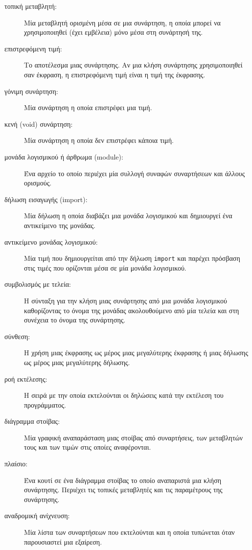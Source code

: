 \documentclass[10pt]{book}
\begin{document}
\begin{description}
\item[τοπική μεταβλητή:] Μία μεταβλητή ορισμένη μέσα σε μια συνάρτηση, η οποία 
μπορεί να χρησιμοποιηθεί (έχει εμβέλεια) μόνο μέσα στη συνάρτησή της.

\item[επιστρεφόμενη τιμή:] Το αποτέλεσμα μιας συνάρτησης. Αν μια κλήση συνάρτησης χρησιμοποιηθεί σαν έκφραση, η επιστρεφόμενη τιμή είναι η τιμή της έκφρασης.

\item[γόνιμη συνάρτηση:] Μία συνάρτηση η οποία επιστρέφει μια τιμή.

\item[κενή  (void)  συνάρτηση:] Μία συνάρτηση η οποία δεν επιστρέφει κάποια τιμή.

\item[μονάδα λογισμικού ή άρθρωμα (module):] Ένα αρχείο το οποίο περιέχει μία συλλογή συναφών συναρτήσεων και άλλους ορισμούς.

\item[δήλωση εισαγωγής (import):] Μία δήλωση η οποία διαβάζει μια μονάδα λογισμικού και δημιουργεί ένα αντικείμενο της μονάδας.

\item[αντικείμενο μονάδας λογισμικού:] Μία τιμή που δημιουργείται από την δήλωση {\tt import} και παρέχει πρόσβαση στις τιμές που ορίζονται μέσα σε μία μονάδα λογισμικού.

\item[συμβολισμός με τελεία:] Η σύνταξη για την κλήση μιας συνάρτησης από μια μονάδα λογισμικού καθορίζοντας το όνομα της μονάδας ακολουθούμενο από μία τελεία και στη συνέχεια το όνομα της συνάρτησης.

\item[σύνθεση:] Η χρήση μιας έκφρασης ως μέρος μιας μεγαλύτερης έκφρασης
ή μιας δήλωσης ως μέρος μιας μεγαλύτερης δήλωσης.

\item[ροή εκτέλεσης:] Η σειρά με την οποία εκτελούνται οι δηλώσεις κατά την εκτέλεση του προγράμματος.

\item[διάγραμμα στοίβας:] Μία γραφική αναπαράσταση μιας στοίβας από συναρτήσεις, των μεταβλητών τους και των τιμών στις οποίες αναφέρονται.

\item[πλαίσιο:] Ένα κουτί σε ένα διάγραμμα στοίβας το οποίο αναπαριστά μια κλήση συνάρτησης. Περιέχει τις τοπικές μεταβλητές και τις παραμέτρους της συνάρτησης.

\item[αναδρομική ανίχνευση:] Μία λίστα των συναρτήσεων που εκτελούνται και η οποία τυπώνεται όταν παρουσιαστεί μια εξαίρεση.


\end{description}
\end{document}
